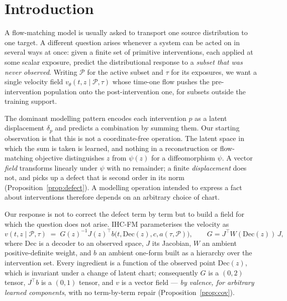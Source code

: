 \documentclass{article}
\newcommand{\Pset}{\mathcal{P}}
\newcommand{\Dec}{\mathrm{Dec}}
\begin{document}
\section{Introduction}

A flow-matching model is usually asked to transport one source distribution to one target.
A different question arises whenever a system can be acted on in several ways at once: given
a finite set of primitive interventions, each applied at some scalar exposure, predict the
distributional response to a \emph{subset that was never observed}. Writing $\Pset$ for the
active subset and $\tau$ for its exposures, we want a single velocity field
$v_{\theta}(t, z \mid \Pset, \tau)$ whose time-one flow pushes the pre-intervention
population onto the post-intervention one, for subsets outside the training support.

The dominant modelling pattern encodes each intervention $p$ as a latent displacement
$\delta_{p}$ and predicts a combination by summing them. Our starting observation is that
this is not a coordinate-free operation. The latent space in which the sum is taken is
learned, and nothing in a reconstruction or flow-matching objective distinguishes $z$ from
$\psi(z)$ for a diffeomorphism $\psi$. A vector \emph{field} transforms linearly under
$\psi$ with no remainder; a finite \emph{displacement} does not, and picks up a defect that
is second order in its norm (Proposition~\ref{prop:defect}). A modelling operation intended
to express a fact about interventions therefore depends on an arbitrary choice of chart.

Our response is not to correct the defect term by term but to build a field for which the
question does not arise. IHC-FM parameterises the velocity as
\begin{equation}
v(t, z \mid \Pset, \tau) \;=\; G(z)^{-1} J(z)^{\top} b\bigl(t, \Dec(z), c, a(\tau, \Pset)\bigr),
\qquad G = J^{\top} W(\Dec(z))\, J ,
\label{eq:field}
\end{equation}
where $\Dec$ is a decoder to an observed space, $J$ its Jacobian, $W$ an ambient
positive-definite weight, and $b$ an ambient one-form built as a hierarchy over the
intervention set. Every ingredient is a function of the observed point $\Dec(z)$, which is
invariant under a change of latent chart; consequently $G$ is a $(0,2)$ tensor, $J^{\top}b$
is a $(0,1)$ tensor, and $v$ is a vector field --- \emph{by valence, for arbitrary learned
components}, with no term-by-term repair (Proposition~\ref{prop:cov}).
\end{document}

